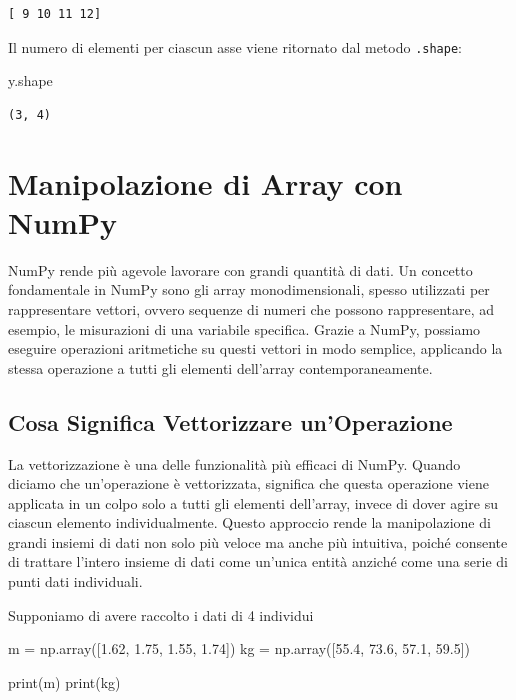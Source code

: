 \documentclass[
  letterpaper,
  krantz2]{{[}./krantz{]}}
\newenvironment{Shaded}{\begin{snugshade}}{\end{snugshade}}
\newcommand{\BuiltInTok}[1]{\textcolor[rgb]{0.00,0.23,0.31}{#1}}
\newcommand{\FloatTok}[1]{\textcolor[rgb]{0.68,0.00,0.00}{#1}}
\newcommand{\NormalTok}[1]{\textcolor[rgb]{0.00,0.23,0.31}{#1}}
\newcommand{\OperatorTok}[1]{\textcolor[rgb]{0.37,0.37,0.37}{#1}}
\begin{document}
\begin{verbatim}
[ 9 10 11 12]
\end{verbatim}

Il numero di elementi per ciascun asse viene ritornato dal metodo
\texttt{.shape}:

\begin{Shaded}
\begin{Highlighting}[]
\NormalTok{y.shape}
\end{Highlighting}
\end{Shaded}

\begin{verbatim}
(3, 4)
\end{verbatim}

\section{Manipolazione di Array con
NumPy}\label{manipolazione-di-array-con-numpy}

NumPy rende più agevole lavorare con grandi quantità di dati. Un
concetto fondamentale in NumPy sono gli array monodimensionali, spesso
utilizzati per rappresentare vettori, ovvero sequenze di numeri che
possono rappresentare, ad esempio, le misurazioni di una variabile
specifica. Grazie a NumPy, possiamo eseguire operazioni aritmetiche su
questi vettori in modo semplice, applicando la stessa operazione a tutti
gli elementi dell'array contemporaneamente.

\subsection{Cosa Significa Vettorizzare
un'Operazione}\label{cosa-significa-vettorizzare-unoperazione}

La vettorizzazione è una delle funzionalità più efficaci di NumPy.
Quando diciamo che un'operazione è vettorizzata, significa che questa
operazione viene applicata in un colpo solo a tutti gli elementi
dell'array, invece di dover agire su ciascun elemento individualmente.
Questo approccio rende la manipolazione di grandi insiemi di dati non
solo più veloce ma anche più intuitiva, poiché consente di trattare
l'intero insieme di dati come un'unica entità anziché come una serie di
punti dati individuali.

Supponiamo di avere raccolto i dati di 4 individui

\begin{Shaded}
\begin{Highlighting}[]
\NormalTok{m }\OperatorTok{=}\NormalTok{ np.array([}\FloatTok{1.62}\NormalTok{, }\FloatTok{1.75}\NormalTok{, }\FloatTok{1.55}\NormalTok{, }\FloatTok{1.74}\NormalTok{])}
\NormalTok{kg }\OperatorTok{=}\NormalTok{ np.array([}\FloatTok{55.4}\NormalTok{, }\FloatTok{73.6}\NormalTok{, }\FloatTok{57.1}\NormalTok{, }\FloatTok{59.5}\NormalTok{])}

\BuiltInTok{print}\NormalTok{(m)}
\BuiltInTok{print}\NormalTok{(kg)}
\end{Highlighting}
\end{Shaded}
\end{document}
